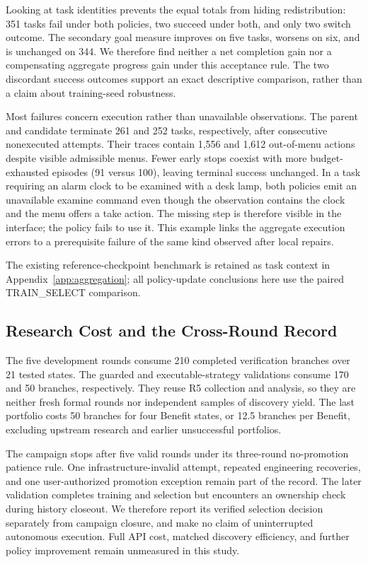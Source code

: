 Looking at task identities prevents the equal totals from hiding
redistribution: 351 tasks fail under both policies, two succeed under
both, and only two switch outcome. The secondary goal measure improves
on five tasks, worsens on six, and is unchanged on 344. We therefore find
neither a net completion gain nor a compensating aggregate progress gain
under this acceptance rule. The two discordant success outcomes support
an exact descriptive comparison, rather than a claim about training-seed
robustness.

Most failures concern execution rather than unavailable observations.
The parent and candidate terminate 261 and 252 tasks, respectively, after
consecutive nonexecuted attempts. Their traces contain 1,556 and 1,612
out-of-menu actions despite visible admissible menus. Fewer early stops
coexist with more budget-exhausted episodes (91 versus 100), leaving
terminal success unchanged. In a task requiring an alarm clock to be
examined with a desk lamp, both policies emit an unavailable examine
command even though the observation contains the clock and the menu
offers a take action. The missing step is therefore visible in the
interface; the policy fails to use it. This example links the aggregate
execution errors to a prerequisite failure of the same kind observed
after local repairs.

The existing reference-checkpoint benchmark is retained as task context
in Appendix~\ref{app:aggregation}; all policy-update conclusions here use
the paired TRAIN\_SELECT comparison.

\subsection{Research Cost and the Cross-Round Record}
\label{sec:discovery-results}
The five development rounds consume 210 completed verification branches
over 21 tested states. The guarded and executable-strategy validations
consume 170 and 50 branches, respectively. They reuse R5 collection and
analysis, so they are neither fresh formal rounds nor independent samples
of discovery yield. The last portfolio costs 50 branches for four Benefit
states, or 12.5 branches per Benefit, excluding upstream research and
earlier unsuccessful portfolios.

The campaign stops after five valid rounds under its three-round
no-promotion patience rule. One infrastructure-invalid attempt, repeated
engineering recoveries, and one user-authorized promotion exception remain
part of the record. The later validation completes training and selection
but encounters an ownership check during history closeout. We therefore
report its verified selection decision separately from campaign closure,
and make no claim of uninterrupted autonomous execution. Full API cost,
matched discovery efficiency, and further policy improvement remain
unmeasured in this study.
